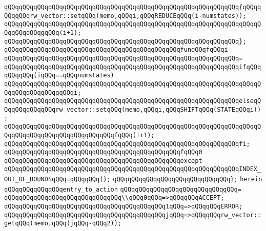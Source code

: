 \verb|qQQqqQQqqQQqqQQqqQQqqQQqqQQqqQQqqQQqqQQqqQQqqQQqqQQqqQQqqQQqqQQq{qQQqqQQqqQQqrw_vector::setqQQq(memo,qQQqi,qQQqREDUCEqQQq(i-numstates));|\newline
\verb|qQQqqQQqqQQqqQQqqQQqqQQqqQQqqQQqqQQqqQQqqQQqqQQqqQQqqQQqqQQqqQQqqQQqqQQqqQQqqQQqgqQQq(i+1);|\newline
\verb|qQQqqQQqqQQqqQQqqQQqqQQqqQQqqQQqqQQqqQQqqQQqqQQqqQQqqQQqqQQqqQQq};|\newline
\newline
\verb|qQQqqQQqqQQqqQQqqQQqqQQqqQQqqQQqqQQqqQQqqQQqqQQqfunqQQqfqQQqi|\newline
\verb|qQQqqQQqqQQqqQQqqQQqqQQqqQQqqQQqqQQqqQQqqQQqqQQqqQQqqQQqqQQqqQQq=|\newline
\verb|qQQqqQQqqQQqqQQqqQQqqQQqqQQqqQQqqQQqqQQqqQQqqQQqqQQqqQQqqQQqqQQqifqQQqqQQqqQQq(iqQQq==qQQqnumstates)|\newline
\verb|qQQqqQQqqQQqqQQqqQQqqQQqqQQqqQQqqQQqqQQqqQQqqQQqqQQqqQQqqQQqqQQqqQQqqQQqqQQqqQQqqQQqgqQQqi;|\newline
\verb|qQQqqQQqqQQqqQQqqQQqqQQqqQQqqQQqqQQqqQQqqQQqqQQqqQQqqQQqqQQqqQQqelseqQQqqQQqqQQqqQQqrw_vector::setqQQq(memo,qQQqi,qQQqSHIFTqQQq(STATEqQQqi));|\newline
\verb|qQQqqQQqqQQqqQQqqQQqqQQqqQQqqQQqqQQqqQQqqQQqqQQqqQQqqQQqqQQqqQQqqQQqqQQqqQQqqQQqqQQqqQQqqQQqqQQqqQQqfqQQq(i+1);|\newline
\verb|qQQqqQQqqQQqqQQqqQQqqQQqqQQqqQQqqQQqqQQqqQQqqQQqqQQqqQQqqQQqqQQqfi;|\newline
\newline
\verb|qQQqqQQqqQQqqQQqqQQqqQQqqQQqqQQqqQQqqQQqqQQqqQQqfqQQq0|\newline
\verb|qQQqqQQqqQQqqQQqqQQqqQQqqQQqqQQqqQQqqQQqqQQqqQQqexcept|\newline
\verb|qQQqqQQqqQQqqQQqqQQqqQQqqQQqqQQqqQQqqQQqqQQqqQQqqQQqqQQqqQQqqQQqINDEX_OUT_OF_BOUNDSqQQq=qQQqqQQq();|\newline
\verb|qQQqqQQqqQQqqQQqqQQqqQQqqQQqqQQq};|\newline
\verb|herein|\newline
\verb|qQQqqQQqqQQqqQQqentry_to_action|\newline
\verb|qQQqqQQqqQQqqQQqqQQqqQQqqQQqqQQq=|\newline
\verb|qQQqqQQqqQQqqQQqqQQqqQQqqQQqqQQq\\qQQq0qQQq=>qQQqqQQqACCEPT;|\newline
\verb|qQQqqQQqqQQqqQQqqQQqqQQqqQQqqQQqqQQqqQQqqQQq1qQQq=>qQQqqQQqERROR;|\newline
\verb|qQQqqQQqqQQqqQQqqQQqqQQqqQQqqQQqqQQqqQQqqQQqjqQQq=>qQQqqQQqrw_vector::getqQQq(memo,qQQq(jqQQq-qQQq2));|\newline
